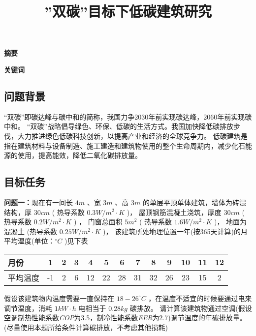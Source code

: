 \documentclass[a4paper, 12pt]{article}
\numberwithin{equation}{section}
\begin{document}
    \title{''双碳''目标下低碳建筑研究}
    \author{}
    \date{}
    \maketitle

    \centerline{\textbf{\LARGE{摘要}}}

    \textbf{\Large{关键词}}

    {}
        \subsection{问题背景}
        “双碳”即碳达峰与碳中和的简称，我国力争2030年前实现碳达峰，2060年前实现碳中和。
        “双碳”战略倡导绿色、环保、低碳的生活方式。我国加快降低碳排放步伐，大力推进绿色低碳科技创新，以提高产业和经济的全球竞争力。
        低碳建筑是指在建筑材料与设备制造、施工建造和建筑物使用的整个生命周期内，减少化石能源的使用，提高能效，降低二氧化碳排放量。

        \subsection{目标任务}
            \textbf{问题一：}现在有一间长 $ 4 m $ 、宽 $ 3 m $ 、高 $ 3 m $ 的单层平顶单体建筑，墙体为砖混结构，厚 $ 30 cm $ ( 热导系数 $ 0.3 W / m^{2} \cdot K $ )，
            屋顶钢筋混凝土浇筑，厚度 $ 30 cm $ ( 热导系数 $ 0.2 W / m^{2} \cdot K $ ) ，
            门窗总面积 $ 5 m^{2} $ ( 热导系数 $ 1.6 W / m^{2} \cdot K $ )，
            地面为混凝土 (热导系数 $ 0.25 W / m^{2} \cdot K $ )，
            该建筑所处地理位置一年(按365天计算)的月平均温度(单位：$ ^{\circ} C $ )见下表
            \begin{tabular}{|l|c|c|c|c|c|c|c|c|c|c|c|c|} \hline
                月份 & 1 & 2 & 3 & 4 & 5 & 6 & 7 & 8 & 9 & 10 & 11 & 12 \\ \hline
                平均温度 & -1 & 2 & 6 & 12 & 22 & 28 & 31 & 32 & 26 & 23 & 15 & 2\\ \hline
            \end{tabular}
            假设该建筑物内温度需要一直保持在 $ 18 - 26 ^{\circ}C $ ，在温度不适宜的时候要通过电来调节温度，消耗 $ 1 kW \cdot h $ 电相当于 $ 0.28kg $ 碳排放。
            请计算该建筑物通过空调(假设空调制热性能系数\textit{COP}为3.5，制冷性能系数\textit{EER}为2.7)调节温度的年碳排放量。
            (尽量使用本题所给条件计算碳排放，不考虑其他损耗)
\end{document}
